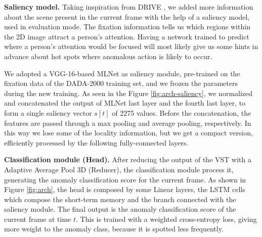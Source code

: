 \noindent\textbf{Saliency model.}
Taking inspiration from DRIVE \cite{bao2021drive}, we added more information about the scene present in the current frame with the help of a saliency model, used in evaluation mode.
The fixation information tells us which regions within the 2D image attract a person's attention.
Having a network trained to predict where a person's attention would be focused will most likely give us some hints in advance about hot spots where anomalous action is likely to occur.

We adopted a VGG-16-based MLNet \cite{cornia2016deep} as saliency module, pre-trained on the fixation data of the DADA-2000 \cite{fang2019dada} training set, and we frozen the parameters during the new training.
As seen in the Figure \ref{fig:arch-saliency}, we normalized and concatenated the output of MLNet last layer and the fourth last layer, to form a single saliency vector $s[t]$ of 2275 values.
Before the concatenation, the features are passed through a max pooling and average pooling, respectively.
In this way we lose some of the locality information, but we get a compact version, efficiently processed by the following fully-connected layers.

\noindent\textbf{Classification module (Head).}
After reducing the output of the VST with a Adaptive Average Pool 3D (Reducer), the classification module process it, generating the anomaly classification score for the current frame.
As shown in Figure \ref{fig:arch}, the head is composed by some Linear layers, the LSTM cells which compose the short-term memory and the branch connected with the saliency module.
The final output is the anomaly classification score of the current frame at time $t$.
This is trained with a weighted cross-entropy loss, giving more weight to the anomaly class, because it is spotted less frequently.

